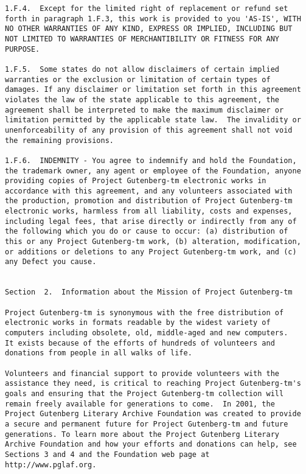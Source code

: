 \documentclass[letterpaper,12pt,oneside,openany]{memoir}
\begin{document}
\begin{verbatim}
1.F.4.  Except for the limited right of replacement or refund set
forth in paragraph 1.F.3, this work is provided to you 'AS-IS', WITH
NO OTHER WARRANTIES OF ANY KIND, EXPRESS OR IMPLIED, INCLUDING BUT
NOT LIMITED TO WARRANTIES OF MERCHANTIBILITY OR FITNESS FOR ANY
PURPOSE.

1.F.5.  Some states do not allow disclaimers of certain implied
warranties or the exclusion or limitation of certain types of
damages. If any disclaimer or limitation set forth in this agreement
violates the law of the state applicable to this agreement, the
agreement shall be interpreted to make the maximum disclaimer or
limitation permitted by the applicable state law.  The invalidity or
unenforceability of any provision of this agreement shall not void
the remaining provisions.

1.F.6.  INDEMNITY - You agree to indemnify and hold the Foundation,
the trademark owner, any agent or employee of the Foundation, anyone
providing copies of Project Gutenberg-tm electronic works in
accordance with this agreement, and any volunteers associated with
the production, promotion and distribution of Project Gutenberg-tm
electronic works, harmless from all liability, costs and expenses,
including legal fees, that arise directly or indirectly from any of
the following which you do or cause to occur: (a) distribution of
this or any Project Gutenberg-tm work, (b) alteration, modification,
or additions or deletions to any Project Gutenberg-tm work, and (c)
any Defect you cause.


Section  2.  Information about the Mission of Project Gutenberg-tm

Project Gutenberg-tm is synonymous with the free distribution of
electronic works in formats readable by the widest variety of
computers including obsolete, old, middle-aged and new computers.
It exists because of the efforts of hundreds of volunteers and
donations from people in all walks of life.

Volunteers and financial support to provide volunteers with the
assistance they need, is critical to reaching Project Gutenberg-tm's
goals and ensuring that the Project Gutenberg-tm collection will
remain freely available for generations to come.  In 2001, the
Project Gutenberg Literary Archive Foundation was created to provide
a secure and permanent future for Project Gutenberg-tm and future
generations. To learn more about the Project Gutenberg Literary
Archive Foundation and how your efforts and donations can help, see
Sections 3 and 4 and the Foundation web page at
http://www.pglaf.org.



\end{verbatim}
\end{document}
